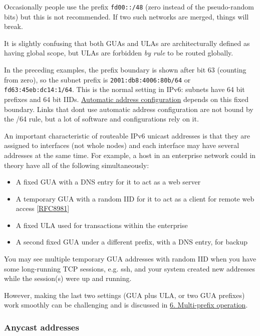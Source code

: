 \documentclass[
]{article}
\providecommand{\tightlist}{%
  \setlength{\itemsep}{0pt}\setlength{\parskip}{0pt}}
\begin{document}
Occasionally people use the prefix \texttt{fd00::/48} (zero instead of
the pseudo-random bits) but this is not recommended. If two such
networks are merged, things will break.

It is slightly confusing that both GUAs and ULAs are architecturally
defined as having \textquotesingle global scope\textquotesingle, but
ULAs are forbidden \emph{by rule} to be routed globally.

In the preceding examples, the prefix boundary is shown after bit 63
(counting from zero), so the subnet prefix is
\texttt{2001:db8:4006:80b/64} or \texttt{fd63:45eb:dc14:1/64}. This is
the normal setting in IPv6: subnets have 64 bit prefixes and 64 bit
IIDs. \hyperref[auto-configuration]{Automatic address configuration}
depends on this fixed boundary. Links that don\textquotesingle t use
automatic address configuration are not bound by the /64 rule, but a lot
of software and configurations rely on it.

An important characteristic of routeable IPv6 unicast addresses is that
they are assigned to interfaces (not whole nodes) and each interface may
have several addresses at the same time. For example, a host in an
enterprise network could in theory have all of the following
simultaneously:

\begin{itemize}
\tightlist
\item
  A fixed GUA with a DNS entry for it to act as a web server
\item
  A temporary GUA with a random IID for it to act as a client for remote
  web access
  {[}\href{https://www.rfc-editor.org/info/rfc8981}{RFC8981}{]}
\item
  A fixed ULA used for transactions within the enterprise
\item
  A second fixed GUA under a different prefix, with a DNS entry, for
  backup
\end{itemize}

You may see multiple temporary GUA addresses with random IID when you
have some long-running TCP sessions, e.g. ssh, and your system created
new addresses while the session(s) were up and running.

However, making the last two settings (GUA plus ULA, or two GUA
prefixes) work smoothly can be challenging and is discussed in
\hyperref[multi-prefix-operation]{6. Multi-prefix operation}.

\subsubsection{Anycast addresses}\label{anycast-addresses}
\end{document}
